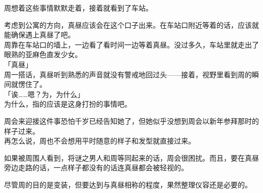 周想着这些事情默默走着，接着就看到了车站。

考虑到公寓的方向，真昼应该会在这个口子出来。在车站口附近等着的话，应该就能确保遇上真昼了吧。\\

周靠在车站口的墙上，一边看了看时间一边等着真昼。没过多久，车站里就走出了眼熟的亚麻色直发少女。\\

「真昼」\\

周一搭话，真昼听到熟悉的声音就没有警戒地回过头——接着，视野里看到周的瞬间就愣住了。\\

「诶……嗯？为，为什么」\\

为什么，指的应该是这身打扮的事情吧。

周会来迎接这件事恐怕千岁已经告知她了，但她似乎没想到周会以新年参拜那时的样子过来。\\

再怎么说，周也不会想用平时随意的样子和发型就直接过来。

如果被周围人看到，将谜之男人和周等同起来的话，周会很困扰。而且，要在真昼旁边走路的话，一点样子都没有的话连真昼都会被轻视的。

尽管周的目的是变装，但要达到与真昼相称的程度，果然整理仪容还是必要的。\\

